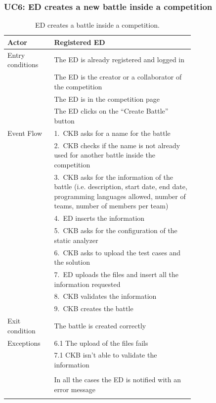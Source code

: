 \subsubsection*{UC6: ED creates a new battle inside a competition}
\begin{center}
  \begin{longtable}{l|p{0.75\linewidth}}
    \hline
    Actor & Registered ED \\
    \hline
    Entry conditions & The ED is already registered and logged in  \\
    & The ED is the creator or a collaborator of the competition \\
    & The ED is in the competition page \\
    & The ED clicks on the “Create Battle” button \\
    \hline
    Event Flow & 1.\ CKB asks for a name for the battle \\
    & 2.\ CKB checks if the name is not already used for another battle inside the competition \\
    & 3.\ CKB asks for the information of the battle (i.e. description, start date, end date, programming languages allowed, number of teams, number of members per team) \\
    & 4.\ ED inserts the information \\
    & 5.\ CKB asks for the configuration of the static analyzer \\
    & 6.\ CKB asks to upload the test cases and the solution \\
    & 7.\ ED uploads the files and insert all the information requested \\
    & 8.\ CKB validates the information \\
    & 9.\ CKB creates the battle \\
    \hline
    Exit condition & The battle is created correctly \\
    \hline
    Exceptions & 6.1 The upload of the files fails \\
    & 7.1 CKB isn’t able to validate the information \\ \\
    & In all the cases the ED is notified with an error message \\
    \hline
    \caption{ED creates a battle inside a competition.}
    \label{tab: ED_create_battle}
  \end{longtable}


\end{center}
